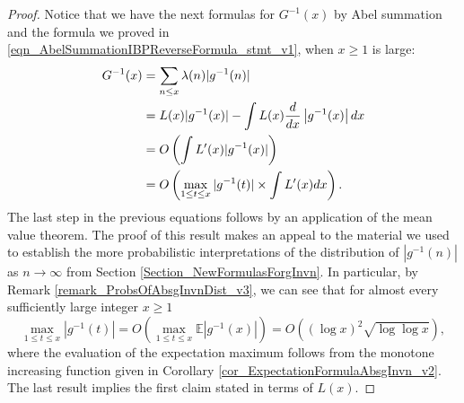 \documentclass[11pt,reqno,a4letter]{article}
\numberwithin{figure}{section}
\numberwithin{table}{section}
\theoremstyle{plain}
\numberwithin{theorem}{section}
\theoremstyle{definition}
\begin{document}
\begin{proof} 
Notice that we have the next formulas for $G^{-1}(x)$ by Abel summation and 
the formula we proved in \eqref{eqn_AbelSummationIBPReverseFormula_stmt_v1}, 
when $x \geq 1$ is large: 
\begin{align} 
\notag 
G^{-1}(x) & = \sum_{n \leq x} \lambda(n) |g^{-1}(n)| \\ 
\notag
     & = L(x) |g^{-1}(x)| - \int L(x) \frac{d}{dx}\left\lvert g^{-1}(x) \right\rvert dx \\ 
\notag
     & = O\left(\int L^{\prime}(x) |g^{-1}(x)|\right) \\ 
\label{proof_tag_GInvx_LxAbelSummationIntFormula_v1} 
     & = O\left(\max_{1 \leq t \leq x} |g^{-1}(t)| \times \int L^{\prime}(x) dx\right).  
\end{align} 
The last step in the previous equations follows by an application of the mean value theorem. 
The proof of this result makes an appeal to the 
material we used to establish the 
more probabilistic interpretations of the distribution of $|g^{-1}(n)|$ as 
$n \rightarrow \infty$ from 
Section \ref{Section_NewFormulasForgInvn}. 
In particular, by Remark \ref{remark_ProbsOfAbsgInvnDist_v3}, 
we can see that for almost every sufficiently large integer $x \geq 1$ 
\[
\max_{1 \leq t \leq x} |g^{-1}(t)| = O\left(\max_{1 \leq t \leq x} \mathbb{E}|g^{-1}(x)|\right) = 
     O\left((\log x)^2 \sqrt{\log\log x}\right), 
\]
where the evaluation of the expectation maximum follows from the monotone increasing function 
given in Corollary \ref{cor_ExpectationFormulaAbsgInvn_v2}. 
The last result implies the first claim stated in terms of $L(x)$. 


\end{proof}
\end{document}
